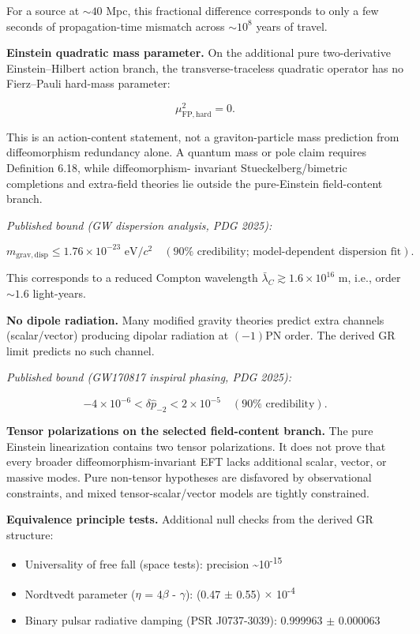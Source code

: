 For a source at \(\sim 40\) Mpc, this fractional difference corresponds to only a few seconds of propagation-time mismatch across \(\sim 10^8\) years of travel.

\textbf{Einstein quadratic mass parameter.} On the additional pure two-derivative
Einstein--Hilbert action branch, the transverse-traceless quadratic operator has no
Fierz--Pauli hard-mass parameter:

\[
\mu_{\mathrm{FP,hard}}^2=0.
\]

This is an action-content statement, not a graviton-particle mass prediction from diffeomorphism
redundancy alone. A quantum mass or pole claim requires Definition 6.18, while diffeomorphism-
invariant Stueckelberg/bimetric completions and extra-field theories lie outside the pure-Einstein
field-content branch.

\emph{Published bound (GW dispersion analysis, PDG 2025):}

\[
m_{\mathrm{grav,disp}} \le 1.76 \times 10^{-23} \text{ eV}/c^2
\quad (90\% \text{ credibility; model-dependent dispersion fit}).
\]

This corresponds to a reduced Compton wavelength \(\bar{\lambda}_C \gtrsim 1.6 \times 10^{16}\) m, i.e., order \(\sim 1.6\) light-years.

\textbf{No dipole radiation.} Many modified gravity theories predict extra channels (scalar/vector) producing dipolar radiation at \((-1)\)PN order. The derived GR limit predicts no such channel.

\emph{Published bound (GW170817 inspiral phasing, PDG 2025):}

\[
-4 \times 10^{-6} < \delta\hat{p}_{-2} < 2 \times 10^{-5}
\quad (90\% \text{ credibility}).
\]

\textbf{Tensor polarizations on the selected field-content branch.} The pure Einstein
linearization contains two tensor polarizations. It does not prove that every broader
diffeomorphism-invariant EFT lacks additional scalar, vector, or massive modes. Pure non-tensor
hypotheses are disfavored by observational constraints, and mixed tensor-scalar/vector models are
tightly constrained.

\textbf{Equivalence principle tests.} Additional null checks from the derived GR structure:

\begin{itemize}
\tightlist
\item
  Universality of free fall (space tests): precision \textasciitilde10\textsuperscript{-}\textsuperscript{1}\textsuperscript{5}
\item
  Nordtvedt parameter (\ensuremath{\eta} = 4\ensuremath{\beta} - \ensuremath{\gamma}): (0.47 \ensuremath{\pm} 0.55) \ensuremath{\times} 10\textsuperscript{-}\textsuperscript{4}
\item
  Binary pulsar radiative damping (PSR J0737-3039): 0.999963 \ensuremath{\pm} 0.000063
\end{itemize}

